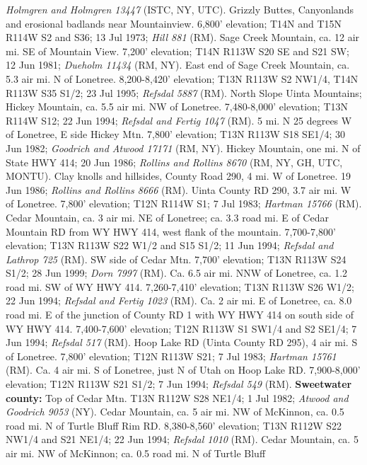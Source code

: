\textit{Holmgren and Holmgren 13447} (ISTC, NY, UTC).
Grizzly Buttes, Canyonlands and erosional badlands near Mountainview.
6,800' elevation;	T14N and T15N R114W S2 and S36; 13 Jul 1973;
\textit{Hill 881} (RM).
Sage Creek Mountain, ca. 12 air mi. SE of Mountain View. 7,200' elevation;
T14N R113W S20 SE and S21 SW; 12 Jun 1981; \textit{Dueholm 11434} (RM, NY).
East end of Sage Creek Mountain, ca. 5.3 air mi. N of Lonetree.
8,200-8,420' elevation; T13N R113W S2 NW1/4, T14N R113W S35 S1/2; 23 Jul 1995;
\textit{Refsdal 5887} (RM).
North Slope Uinta Mountains; Hickey Mountain, ca. 5.5 air mi. NW of Lonetree.
7,480-8,000' elevation; T13N R114W S12; 22 Jun 1994;
\textit{Refsdal and Fertig 1047} (RM).
5 mi. N 25 degrees W of Lonetree, E side Hickey Mtn. 7,800' elevation;
T13N R113W S18 SE1/4; 30 Jun 1982; \textit{Goodrich and Atwood 17171} (RM, NY).
Hickey Mountain, one mi. N of State HWY 414; 20 Jun 1986;
\textit{Rollins and Rollins 8670} (RM, NY, GH, UTC, MONTU).
Clay knolls and hillsides, County Road 290, 4 mi. W of Lonetree. 19 Jun 1986;
\textit{Rollins and Rollins 8666} (RM).
Uinta County RD 290, 3.7 air mi. W of Lonetree. 7,800' elevation;
T12N R114W S1; 7 Jul 1983; \textit{Hartman 15766} (RM).
Cedar Mountain, ca. 3 air mi. NE of Lonetree; ca. 3.3 road mi. E of Cedar
Mountain RD from WY HWY 414, west flank of the mountain.
7,700-7,800' elevation; T13N R113W S22 W1/2 and S15 S1/2; 11 Jun 1994;
\textit{Refsdal and Lathrop 725} (RM).
SW side of Cedar Mtn. 7,700' elevation; T13N R113W S24 S1/2; 28 Jun 1999;
\textit{Dorn 7997} (RM).
Ca. 6.5 air mi. NNW of Lonetree, ca. 1.2 road mi. SW of WY HWY 414.
7,260-7,410' elevation; T13N R113W S26 W1/2; 22 Jun 1994;
\textit{Refsdal and Fertig 1023} (RM).
Ca. 2 air mi. E of Lonetree, ca. 8.0 road mi. E of the junction of County RD 1
with WY HWY 414 on south side of WY HWY 414. 7,400-7,600' elevation;
T12N R113W S1 SW1/4 and S2 SE1/4; 7 Jun 1994; \textit{Refsdal 517} (RM).
Hoop Lake RD (Uinta County RD 295), 4 air mi. S of Lonetree.
7,800' elevation; T12N R113W S21; 7 Jul 1983; \textit{Hartman 15761} (RM).
Ca. 4 air mi. S of Lonetree, just N of Utah on Hoop Lake RD.
7,900-8,000' elevation; T12N R113W S21 S1/2; 7 Jun 1994;
\textit{Refsdal 549} (RM).
  \textbf{Sweetwater county:}
Top of Cedar Mtn. T13N R112W S28 NE1/4; 1 Jul 1982;
\textit{Atwood and Goodrich 9053} (NY).
Cedar Mountain, ca. 5 air mi. NW of McKinnon, ca. 0.5 road mi. N of Turtle Bluff
Rim RD. 8,380-8,560' elevation; T13N R112W S22 NW1/4 and S21 NE1/4;
22 Jun 1994; \textit{Refsdal 1010} (RM).
Cedar Mountain, ca. 5 air mi. NW of McKinnon; ca. 0.5 road mi. N of Turtle Bluff
